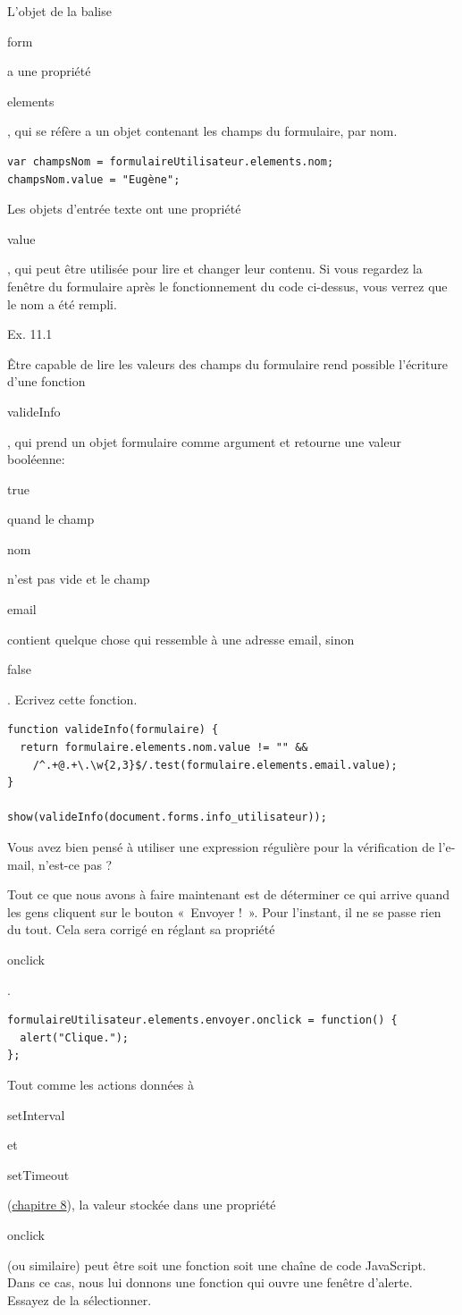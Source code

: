 \documentclass{FramateX}
\renewcommand{\texttt}[1]{\begin{sffamily}{#1}\end{sffamily}}
\begin{document}
L'objet de la balise \texttt{form} a une propriété \texttt{elements},
qui se réfère a un objet contenant les champs du formulaire, par nom.

\begin{lstlisting}
var champsNom = formulaireUtilisateur.elements.nom;
champsNom.value = "Eugène";
\end{lstlisting}
Les objets d'entrée texte ont une propriété \texttt{value}, qui peut
être utilisée pour lire et changer leur contenu. Si vous regardez la
fenêtre du formulaire après le fonctionnement du code ci-dessus, vous
verrez que le nom a été rempli.

\begin{center}\end{center}

Ex. 11.1

Être capable de lire les valeurs des champs du formulaire rend possible
l'écriture d'une fonction \texttt{valideInfo}, qui prend un objet
formulaire comme argument et retourne une valeur booléenne:
\texttt{true} quand le champ \texttt{nom} n'est pas vide et le champ
\texttt{email} contient quelque chose qui ressemble à une adresse email,
sinon \texttt{false}. Ecrivez cette fonction.

\begin{lstlisting}
function valideInfo(formulaire) {
  return formulaire.elements.nom.value != "" &&
    /^.+@.+\.\w{2,3}$/.test(formulaire.elements.email.value);
}

show(valideInfo(document.forms.info_utilisateur));
\end{lstlisting}
Vous avez bien pensé à utiliser une expression régulière pour la
vérification de l'e-mail, n'est-ce pas ?

\begin{center}\end{center}

Tout ce que nous avons à faire maintenant est de déterminer ce qui
arrive quand les gens cliquent sur le bouton «~Envoyer !~». Pour
l'instant, il ne se passe rien du tout. Cela sera corrigé en réglant sa
propriété \texttt{onclick}.

\begin{lstlisting}
formulaireUtilisateur.elements.envoyer.onclick = function() {
  alert("Clique.");
};
\end{lstlisting}
Tout comme les actions données à \texttt{setInterval} et
\texttt{setTimeout} (\href{chapter8.html}{chapitre 8}), la valeur
stockée dans une propriété \texttt{onclick} (ou similaire) peut être
soit une fonction soit une chaîne de code JavaScript. Dans ce cas, nous
lui donnons une fonction qui ouvre une fenêtre d'alerte. Essayez de la
sélectionner.
\end{document}
